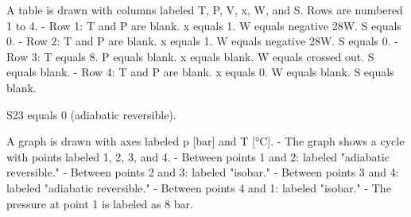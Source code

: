 A table is drawn with columns labeled T, P, V, x, W, and S.  
Rows are numbered 1 to 4.  
- Row 1: T and P are blank. x equals 1. W equals negative 28W. S equals 0.  
- Row 2: T and P are blank. x equals 1. W equals negative 28W. S equals 0.  
- Row 3: T equals 8. P equals blank. x equals blank. W equals crossed out. S equals blank.  
- Row 4: T and P are blank. x equals 0. W equals blank. S equals blank.  

S23 equals 0 (adiabatic reversible).  

A graph is drawn with axes labeled p [bar] and T [°C].  
- The graph shows a cycle with points labeled 1, 2, 3, and 4.  
- Between points 1 and 2: labeled "adiabatic reversible."  
- Between points 2 and 3: labeled "isobar."  
- Between points 3 and 4: labeled "adiabatic reversible."  
- Between points 4 and 1: labeled "isobar."  
- The pressure at point 1 is labeled as 8 bar.